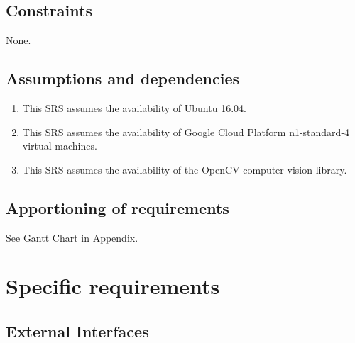 \documentclass[10pt, onecolumn, draftclsnofoot, letterpaper, compsoc]{IEEEtran}
\begin{document}
\subsection{Constraints}
None.

\subsection{Assumptions and dependencies}
	\begin{enumerate}
		\item This SRS assumes the availability of Ubuntu 16.04.

		\item This SRS assumes the availability of Google Cloud Platform
		n1-standard-4 virtual machines.

		\item This SRS assumes the availability of the OpenCV computer
		vision library.
	\end{enumerate}

\subsection{Apportioning of requirements}
See Gantt Chart in Appendix.

\newpage
\section{Specific requirements}

\subsection{External Interfaces}
\end{document}
